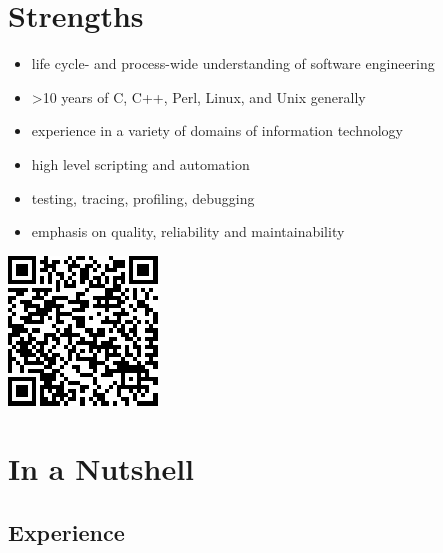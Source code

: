 \documentclass[a4paper,12pt]{article}
\newcommand{\compress}{\setlength\itemsep{-\parskip}}
\begin{document}
\section{Strengths}

\begin{minipage}[b]{0.84\textwidth}
\begin{itemize}\compress
\item	life cycle- and process-wide understanding of software engineering
\item	>10 years of C, C++, Perl, Linux, and Unix generally
\item	experience in a variety of domains of information technology
\item	high level scripting and automation
\item	testing, tracing, profiling, debugging
\item	emphasis on quality, reliability and maintainability
\end{itemize}
\end{minipage}
\parbox[t]{0.16\textwidth}{\includegraphics[scale=0.525,clip=false]{qrcode}}

\section{In a Nutshell}

\subsection*{Experience}
\end{document}

